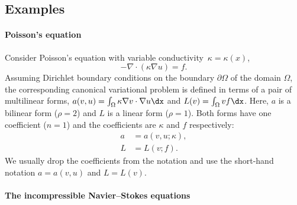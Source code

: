 \subsection{Examples}

\paragraph{Poisson's equation}

Consider Poisson's equation with variable conductivity~$\kappa =
\kappa(x)$,
\begin{displaymath}
  -\nabla \cdot (\kappa \nabla u) = f.
\end{displaymath}
Assuming Dirichlet boundary conditions on the boundary
$\partial\Omega$ of the domain $\Omega$, the corresponding canonical
variational problem is defined in terms of a pair of multilinear
forms, $a(v, u) = \int_{\Omega} \kappa \nabla v \cdot \nabla u \dx$
and $L(v) = \int_{\Omega} v f \dx$. Here, $a$ is a bilinear form
($\rho = 2$) and $L$ is a linear form ($\rho = 1$). Both forms have
one coefficient ($n = 1$) and the coefficients are $\kappa$ and $f$
respectively:
\begin{displaymath}
  \begin{split}
    a &= a(v, u; \kappa), \\
    L &= L(v; f).
  \end{split}
\end{displaymath}
We usually drop the coefficients from the notation and use the
short-hand notation $a = a(v, u)$ and $L = L(v)$.

\paragraph{The incompressible Navier--Stokes equations}

